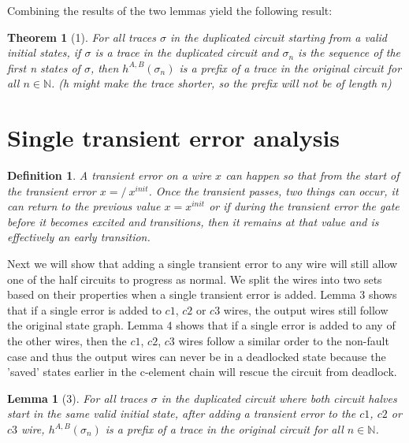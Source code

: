 \documentclass{article}
\newtheorem*{definition}{Definition}
\newtheorem*{theorem}{Theorem}
\newtheorem*{lemma}{Lemma}
\begin{document}
Combining the results of the two lemmas yield the following result:
\begin{theorem}[1]
For all traces $\sigma$ in the duplicated circuit starting from a valid initial states, if $\sigma$ is a trace in the duplicated circuit and $\sigma_n$ is the sequence of the first n states of $\sigma$, then $h^{A,B}(\sigma_n)$ is a prefix of a trace in the original circuit for all $n \in \mathbb{N}$.  (h might make the trace shorter, so the prefix will not be of length n)
\end{theorem}

\section{Single transient error analysis}
\begin{definition}A transient error on a wire $x$ can happen so that from the start of the transient error $x=/~x^{init}$.  Once the transient passes, two things can occur, it can return to the previous value $x=x^{init}$ or if during the transient error the gate before it becomes excited and transitions, then it remains at that value and is effectively an early transition. %
\end{definition}
Next we will show that adding a single transient error to any wire will still allow one of the half circuits to progress as normal.  We split the wires into two sets based on their properties when a single transient error is added.  Lemma 3 shows that if a single error is added to $c1$, $c2$ or $c3$ wires, the output wires still follow the original state graph.  Lemma 4 shows that if a single error is added to any of the other wires, then the $c1$, $c2$, $c3$ wires follow a similar order to the non-fault case and thus the output wires can never be in a deadlocked state because the 'saved' states earlier in the c-element chain will rescue the circuit from deadlock.
\begin{lemma}[3]
For all traces $\sigma$ in the duplicated circuit where both circuit halves start in the same valid initial state, after adding a transient error to the $c1$, $c2$ or $c3$ wire, $h^{A,B}(\sigma_n)$ is a prefix of a trace in the original circuit for all $n \in \mathbb{N}$.
\end{lemma}
\end{document}

